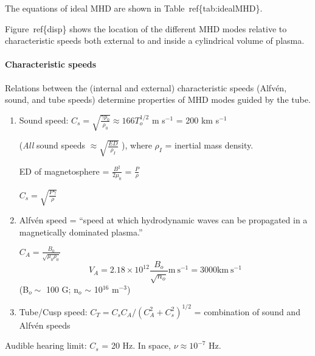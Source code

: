 The equations of ideal MHD are shown in Table~ref\{tab:idealMHD\}.
\

Figure~ref\{disp\} shows the location of the different MHD modes relative to
characteristic speeds both external to and inside a cylindrical volume of
plasma.

\paragraph{Characteristic speeds}
Relations between the (internal and external)
characteristic speeds (Alfv\'en, sound, and tube speeds)
determine properties of MHD modes guided by the tube.

\begin{enumerate}
    \item Sound speed: $C_{s} = \sqrt{\frac{\gamma p_{0}}{\rho_{0}}}
            \approx 166 T_{o}^{1/2}$ m s$^{-1}$ = 200 km s$^{-1}$

            (\emph{All} sound speeds $\approx \sqrt{ \frac{ED}{\rho_{I}} } $ ),
            where $\rho_{I}$ = inertial mass density.

            ED of magnetosphere = $\frac{B^{2}}{2\mu_{0}} $
            = $\frac{P}{\rho} $

            $C_{s} = \sqrt{ \frac{P\gamma}{\rho}  } $

    \item Alfv\'en speed = ``speed at which hydrodynamic waves can be propagated
    in a magnetically dominated plasma.''

        $C_{A} = \frac{B_{0}}{\sqrt{\mu_{0}\rho_{0}}}$
        \[
            V_{A} = 2.18\times10^{12}\frac{B_o}{\sqrt{n_o}}
            \textrm{m}\ \textrm{s}^{-1} = 3000 \textrm{km}\ \textrm{s}^{-1}
            \]
        (B$_{o} \sim$ 100 G; n$_{o}$ $\sim$ 10$^{16}$ m$^{-3}$)
    \item Tube/Cusp speed:
        $C_{T} = C_{s}C_{A}/\left(C_{A}^{2} + C_{s}^{2}\right)^{1/2}$
        = combination of sound and Alfv\'en speeds
\end{enumerate}
Audible hearing limit: $C_{s}$ = 20 Hz. In space, $\nu \approx 10^{-7}$ Hz.



